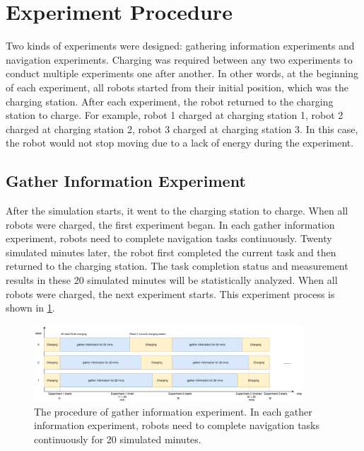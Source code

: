 \section{Experiment Procedure}
Two kinds of experiments were designed: gathering information experiments and navigation experiments. Charging was required between any two experiments to conduct multiple experiments one after another. In other words, at the beginning of each experiment, all robots started from their initial position, which was the charging station. After each experiment, the robot returned to the charging station to charge. For example, robot 1 charged at charging station 1, robot 2 charged at charging station 2, robot 3 charged at charging station 3. In this case, the robot would not stop moving due to a lack of energy during the experiment. 


\subsection{Gather Information Experiment}
After the simulation starts, it went to the charging station to charge. When all robots were charged, the first experiment began. In each gather information experiment, robots need to complete navigation tasks continuously. Twenty simulated minutes later, the robot first completed the current task and then returned to the charging station. The task completion status and measurement results in these 20 simulated minutes will be statistically analyzed. When all robots were charged, the next experiment starts. This experiment process is shown in \ref{fig:env_exp_timeline}.

 \begin{figure}
 \centering
 \includegraphics[width = 0.9\textwidth]{content/images/ch5/env_exp_timeline.drawio.png}
 \caption{The procedure of gather information experiment.  In each gather information experiment, robots need to complete navigation tasks continuously for 20 simulated minutes.}
 \label{fig:env_exp_timeline}
 \end{figure}


